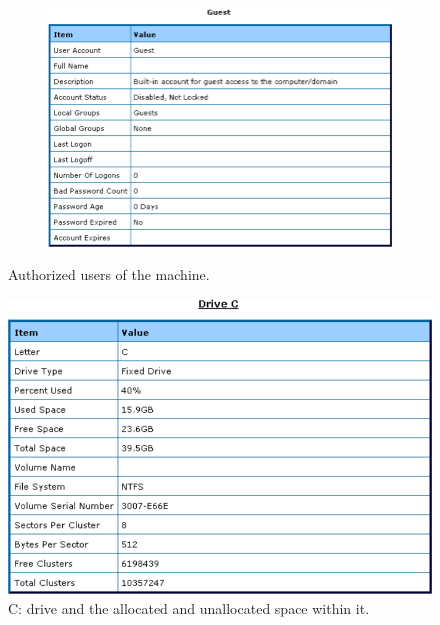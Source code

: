 \begin{figure}[H]
\begin{subfigure}[b]{0.5\textwidth}
        \includegraphics[width=\textwidth]{figures/pic5.png}
    \end{subfigure}
    \caption{Authorized users of the machine.}
\end{figure}

\begin{figure}[H]
    \centering
    \includegraphics[width=0.8\linewidth]{figures/pic6.png}
    \caption{C: drive and the allocated and unallocated space within it.}
\end{figure}

